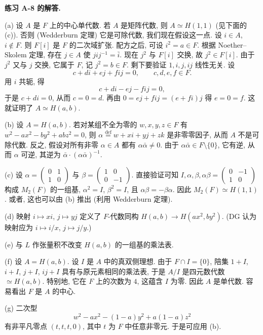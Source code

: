 \noindent\textbf{练习 A-8 的解答.}

(a) 设 $A$ 是 $F$ 上的中心单代数. 若 $A$ 是矩阵代数, 则 $A\simeq H(1,1)$ (见下面的 (c)). 否则 (Wedderburn 定理) 它是可除代数, 我们现在假设这一点. 设 $i\in A$, $i\notin F$. 则 $F[i]$ 是 $F$ 的二次域扩张. 配方之后, 可设 $i^{2}=a\in F$. 根据 Noether--Skolem 定理, 存在 $j\in A$ 使 $jij^{-1}=\bar{i}$. 现在 $j^{2}$ 与 $F[i]$ 交换, 故 $j^{2}\in F[i]$. 由于 $j^{2}$ 又与 $j$ 交换, 它属于 $F$, 记 $j^{2}=b\in F$. 剩下要验证 $1,i,j,ij$ 线性无关. 设
\[
c+di+ej+fij=0,\qquad c,d,e,f\in F.
\]
用 $i$ 共轭, 得
\[
c+di-ej-fij=0,
\]
于是 $c+di=0$, 从而 $c=0=d$. 再由 $0=ej+fij=(e+fi)j$ 得 $e=0=f$. 这就证明了 $A\simeq H(a,b)$.

(b) 设 $A=H(a,b)$. 若对某组不全为零的 $w,x,y,z\in F$ 有 $w^{2}-ax^{2}-by^{2}+abz^{2}=0$, 则 $\alpha\overset{\mathrm{def}}{=}w+xi+yj+zk$ 是非零零因子, 从而 $A$ 不是可除代数. 反之, 假设对所有非零 $\alpha\in A$ 都有 $\alpha\bar{\alpha}\ne0$. 由于 $\alpha\bar{\alpha}\in F\setminus\{0\}$, 它有逆, 从而 $\alpha$ 可逆, 其逆为 $\bar{\alpha}\cdot(\alpha\bar{\alpha})^{-1}$.

(c) 设 $\alpha=\begin{pmatrix}0&1\\1&0\end{pmatrix}$ 与 $\beta=\begin{pmatrix}1&0\\0&-1\end{pmatrix}$. 直接验证可知 $I,\alpha,\beta,\alpha\beta=\begin{pmatrix}0&-1\\1&0\end{pmatrix}$ 构成 $M_2(F)$ 的一组基, $\alpha^{2}=I$, $\beta^{2}=I$, 且 $\alpha\beta=-\beta\alpha$. 因此 $M_2(F)\simeq H(1,1)$. 或者, 这也可以由 (b) 推出 (利用 Wedderburn 定理).

(d) 映射 $i\mapsto xi$, $j\mapsto yj$ 定义了 $F$-代数同构 $H(a,b)\to H(ax^{2},by^{2})$. (DG 认为映射应为 $i\mapsto i/x$, $j\mapsto j/y$.)

(e) 与 $L$ 作张量积不改变 $H(a,b)$ 的一组基的乘法表.

(f) 设 $A=H(a,b)$. 设 $I$ 是 $A$ 中的真双侧理想. 由于 $F\cap I=\{0\}$, 陪集 $1+I$, $i+I$, $j+I$, $ij+I$ 具有与原元素相同的乘法表, 于是 $A/I$ 是四元数代数 $\simeq H(a,b)$. 特别地, 它在 $F$ 上的次数为 $4$, 这蕴含 $I$ 为零. 因此 $A$ 是单代数. 容易看出 $F$ 是 $A$ 的中心.

(g) 二次型
\[
w^{2}-ax^{2}-(1-a)y^{2}+a(1-a)z^{2}
\]
有非平凡零点 $(t,t,t,0)$, 其中 $t$ 为 $F$ 中任意非零元. 于是可应用 (b).

